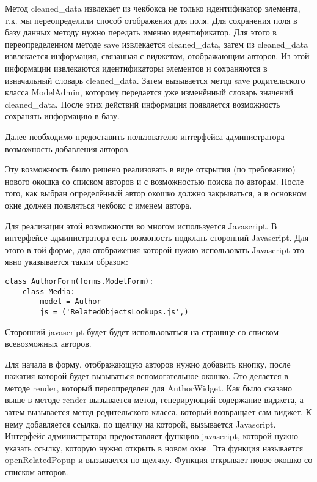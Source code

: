 Метод cleaned\_data извлекает из чекбокса не только идентификатор элемента, т.к. мы переопределили способ отображения для поля. Для сохранения поля в базу данных методу нужно передать именно идентификатор. Для этого в переопределенном методе save извлекается cleaned\_data, затем из cleaned\_data извлекается информация, связанная с виджетом, отображающим авторов. Из этой информации извлекаются идентификаторы элементов и сохраняются в изначальный словарь cleaned\_data. Затем вызывается метод save родительского класса ModelAdmin, которому передается уже изменённый словарь значений cleaned\_data. После этих действий информация появляется возможность сохранять информацию в базу.

Далее необходимо предоставить пользователю интерфейса администратора возможность добавления авторов. 

Эту возможность было решено реализовать в виде открытия (по требованию) нового окошка со списком авторов и с возможностью поиска по авторам. После того, как выбран определённый автор окошко должно закрываться, а в основном окне должен появляться чекбокс с именем автора. 

Для реализации этой возможности во многом используется Javascript. В интерфейсе администратора есть возмоность подклать сторонний Java\-script. Для этого в той форме, для отображения которой нужно использовать Javascript это явно указывается таким образом:

{
\small \begin{verbatim}
class AuthorForm(forms.ModelForm):
    class Media:
    	model = Author
        js = ('RelatedObjectsLookups.js',)

\end{verbatim}
}

Сторонний javascript будет будет использоваться на странице со списком всевозможных авторов.

Для начала в форму, отображающую авторов нужно добавить кнопку, после нажатия которой будет вызываться вспомогательное окошко. Это делается в методе render, который переопределен для AuthorWidget. Как было сказано выше в методе render вызывается метод, генерирующий содержание виджета, а затем вызывается метод родительского класса, который возвращает сам виджет. К нему добавляется ссылка, по щелчку на которой, вызывается Javascript. Интерфейс администратора предоставляет функцию javascript, которой нужно указать ссылку, которую нужно открыть в новом окне. Эта функция называется openRelatedPopup и вызывается по щелчку. Функция открывает новое окошко со списком авторов.

